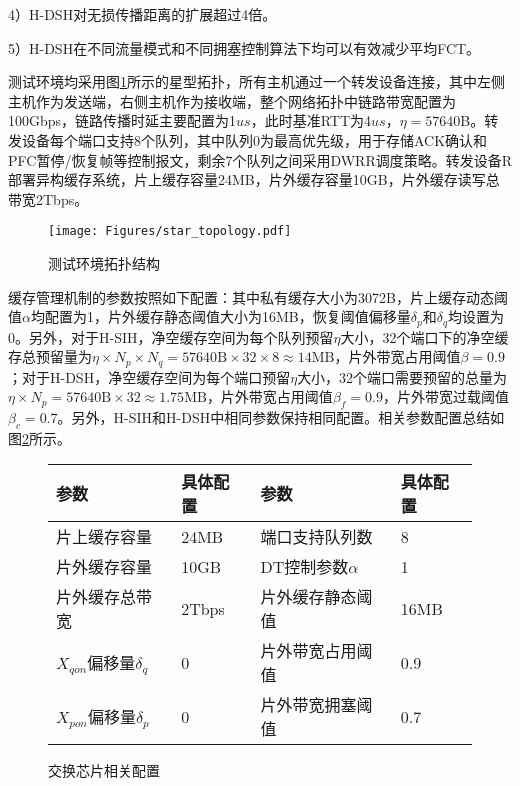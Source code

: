 4）H-DSH对无损传播距离的扩展超过4倍。

5）H-DSH在不同流量模式和不同拥塞控制算法下均可以有效减少平均FCT。


测试环境均采用图\ref{c4:s1:ss1:fig:star topology}所示的星型拓扑，所有主机通过一个转发设备连接，其中左侧主机作为发送端，右侧主机作为接收端，整个网络拓扑中链路带宽配置为100Gbps，链路传播时延主要配置为1$us$，此时基准RTT为4$us$，$\eta=57640$B。转发设备每个端口支持8个队列，其中队列0为最高优先级，用于存储ACK确认和PFC暂停/恢复帧等控制报文，剩余7个队列之间采用DWRR调度策略。转发设备R部署异构缓存系统，片上缓存容量24MB，片外缓存容量10GB，片外缓存读写总带宽2Tbps。

\begin{figure}[H]
  \centering
  \texttt{[image: Figures/star\_topology.pdf]}
  \caption{测试环境拓扑结构}
  \label{c4:s1:ss1:fig:star topology}
\end{figure}

缓存管理机制的参数按照如下配置：其中私有缓存大小为3072B，片上缓存动态阈值$\alpha$均配置为1，片外缓存静态阈值大小为16MB，恢复阈值偏移量$\delta_p$和$\delta_q$均设置为0。另外，对于H-SIH，净空缓存空间为每个队列预留$\eta$大小，32个端口下的净空缓存总预留量为$\eta \times N_p \times N_q = 57640\text{B} \times 32 \times 8 \approx 14\text{MB}$，片外带宽占用阈值$\beta = 0.9$；对于H-DSH，净空缓存空间为每个端口预留$\eta$大小，32个端口需要预留的总量为$\eta \times N_p= 57640\text{B} \times 32 \approx 1.75\text{MB}$，片外带宽占用阈值$\beta_f = 0.9$，片外带宽过载阈值$\beta_c = 0.7$。另外，H-SIH和H-DSH中相同参数保持相同配置。相关参数配置总结如图\ref{fig:c4:parameter setting}所示。

\begin{figure}[H]
  \begin{table}[H]
      \begin{tabularx}{\textwidth}{YYYY}
      \toprule
          \textbf{参数} & \textbf{具体配置} & \textbf{参数} & \textbf{具体配置} \\
      \midrule
          片上缓存容量 & 24MB & 端口支持队列数 & 8 \\
          片外缓存容量 & 10GB  & DT控制参数$\alpha$ & 1\\
          片外缓存总带宽 & 2Tbps & 片外缓存静态阈值 & 16MB \\
          $X_{qon}$偏移量$\delta_q$ & 0 & 片外带宽占用阈值 & 0.9 \\
          $X_{pon}$偏移量$\delta_p$ & 0 & 片外带宽拥塞阈值 & 0.7 \\
      \bottomrule
      \end{tabularx}
  \end{table}
  \caption{交换芯片相关配置}
  \label{fig:c4:parameter setting}
\end{figure}

